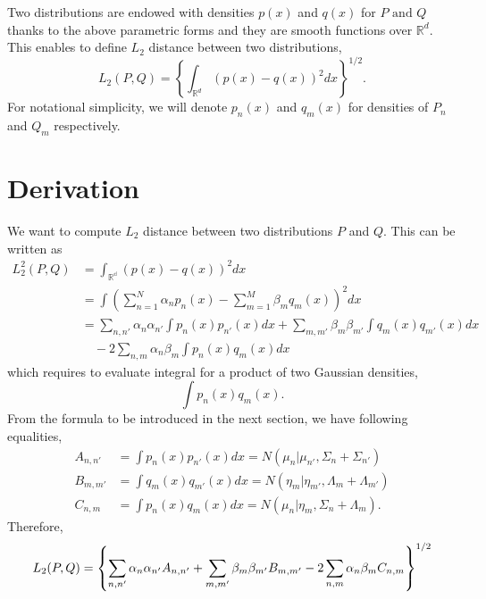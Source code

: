 \documentclass[fontsize=12pt]{article}
\begin{document}
Two distributions are endowed with densities $p(x)$ and $q(x)$ for $P\text{ and }Q$ thanks to the above parametric forms and they are smooth functions over $\mathbb{R}^d$. This enables to define $L_2$ distance between two distributions,
\begin{equation}
L_2 (P,Q) = 
\left\lbrace
\int_{\mathbb{R}^d} (p(x)-q(x))^2 dx
\right\rbrace^{1/2}. 
\end{equation}
For notational simplicity, we will denote $p_n (x)$ and $q_m (x)$ for densities of $P_n$ and $Q_m$ respectively. 

\section{Derivation}

We want to compute $L_2$ distance between two distributions $P$ and $Q$. This can be written as
\begin{align*}
L_2^2(P,Q) &= \int_{\mathbb{{R}^d}} (p(x)-q(x))^2 dx \\
&= \int \left(
\sum_{n=1}^N \alpha_n p_n(x) - \sum_{m=1}^M \beta_m q_m (x) \right)^2 dx \\
&= 
\sum_{n,n'} \alpha_n \alpha_{n'} \int p_n (x) p_{n'}(x) dx +
\sum_{m,m'} \beta_m \beta_{m'} \int q_m (x) q_{m'} (x) dx \\
&\quad -2 \sum_{n,m} \alpha_n \beta_m \int p_n (x) q_m (x) dx
\end{align*}
which requires to evaluate integral for a product of two Gaussian densities, 
\begin{equation*}
\int p_n (x) q_m (x). \tag{*}
\end{equation*}
From the formula to be introduced in the next section, we have following equalities,
\begin{align*}
A_{n,n'} &= \int p_n (x) p_{n'} (x) dx = N(\mu_n | \mu_{n'}, \Sigma_n + \Sigma_{n'}) \\
B_{m,m'} &= \int q_m (x) q_{m'} (x) dx = N(\eta_m | \eta_{m'}, \Lambda_m + \Lambda_{m'}) \\
C_{n,m} &=\int p_n (x) q_m (x) dx = N(\mu_n | \eta_m, \Sigma_n + \Lambda_m).
\end{align*}
Therefore, 
\begin{equation*}
L_2 (P,Q) = \left\lbrace
\sum_{n,n'} \alpha_n \alpha_{n'} A_{n,n'} + 
\sum_{m,m'} \beta_m \beta_{m'} B_{m,m'} \\
- 2 \sum_{n,m} \alpha_n \beta_m C_{n,m}
\right\rbrace^{1/2}
\end{equation*}
\end{document}
